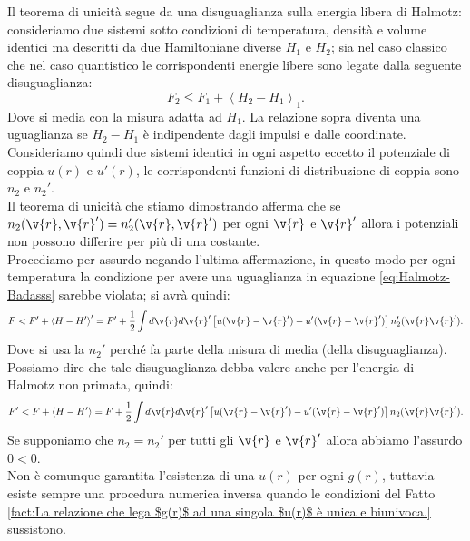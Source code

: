 Il teorema di unicità segue da una disuguaglianza sulla energia libera di Halmotz: consideriamo due sistemi sotto condizioni di temperatura, densità e volume identici ma descritti da due Hamiltoniane diverse $H_1$ e $H_2$; sia nel caso classico che nel caso quantistico le corrispondenti energie libere sono legate dalla seguente disuguaglianza:
\[
    F_2\le F_1 + \left<H_2-H_1\right>_1 \label{eq:Halmotz-Badasss}
.\] 
Dove si media con la misura adatta ad $H_1$. La relazione sopra diventa una uguaglianza se $H_2-H_1$ è indipendente dagli impulsi e dalle coordinate.\\
Consideriamo quindi due sistemi identici in ogni aspetto eccetto il potenziale di coppia $u(r)$ e $u'(r)$, le corrispondenti funzioni di distribuzione di coppia sono $n_2$ e $n_2'$. \\
Il teorema di unicità che stiamo dimostrando afferma che se $n_2(\v{r},\v{r}') = n'_2(\v{r},\v{r}')$ per ogni $\v{r}$ e $\v{r}'$ allora i potenziali non possono differire per più di una costante.\\
Procediamo per assurdo negando l'ultima affermazione, in questo modo per ogni temperatura la condizione per avere una uguaglianza in equazione \ref{eq:Halmotz-Badasss} sarebbe violata; si avrà quindi:
\[
    F< F' + \left<H-H'\right>'=
    F'+\frac{1}{2}\int d\v{r}d\v{r}'\left[u(\v{r}-\v{r}') - u'(\v{r}-\v{r}') \right]n_2'(\v{r}\v{r}') 	
.\] 
Dove si usa la $n_2'$ perché fa parte della misura di media (della disuguaglianza). Possiamo dire che tale disuguaglianza debba valere anche per l'energia di Halmotz non primata, quindi:
\[
    F'< F + \left<H-H'\right>=
    F+\frac{1}{2}\int d\v{r}d\v{r}'\left[u(\v{r}-\v{r}') - u'(\v{r}-\v{r}') \right]n_2(\v{r}\v{r}') 	
.\] 
Se supponiamo che $n_2=n_2'$ per tutti gli $\v{r}$ e $\v{r}'$ allora abbiamo l'assurdo $0<0$.\\
Non è comunque garantita l'esistenza di una $u(r)$ per ogni $g(r)$, tuttavia esiste sempre una procedura numerica inversa quando le condizioni del Fatto \ref{fact:La relazione che lega $g(r)$ ad una singola $u(r)$ è unica e biunivoca.} sussistono.\\ 
